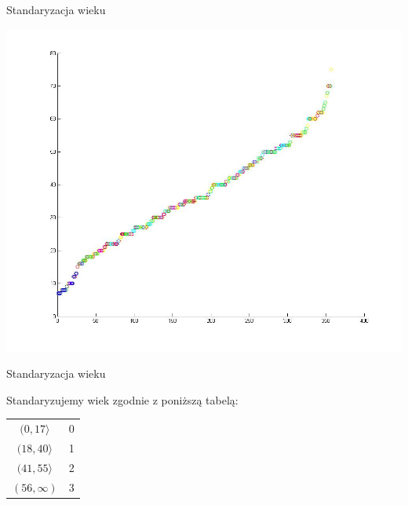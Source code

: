 \documentclass{beamer}
\begin{document}
\begin{frame}{Standaryzacja wieku}

\begin{center}
  \includegraphics[scale=0.3]{img/age_scatter.jpg}  
\end{center}

\end{frame}

\begin{frame}{Standaryzacja wieku}
\begin{center}

Standaryzujemy wiek zgodnie z poniższą tabelą:

\vspace{0.5cm}

{\LARGE 
\begin{tabular}{ | c | c | }
  \hline
  $(0,17\rangle$ & 0 \\
  $(18,40\rangle$ & 1 \\
  $(41,55\rangle$ & 2 \\
  $(56,\infty)$ & 3 \\
  \hline
\end{tabular}
}
\end{center}
\end{frame}
\end{document}
